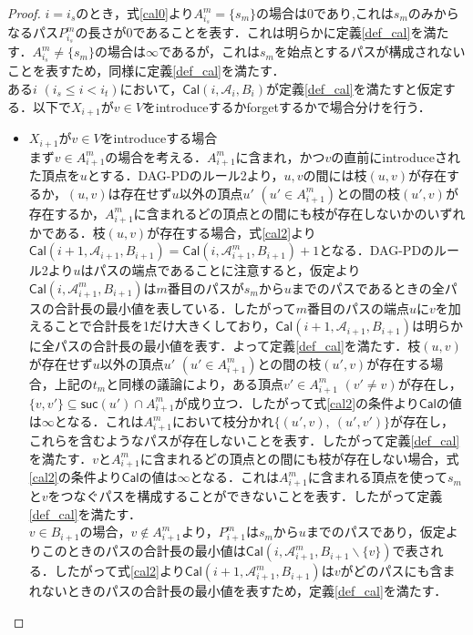 \documentclass[master]{kuisthesis}		%
\theoremstyle{plain}
\theoremstyle{definition}
\begin{document}
\begin{proof}
    $i=i_s$のとき，式\ref{cal0}より$A^m_{i_s} = \{s_m\}$の場合は0であり,これは$s_m$のみからなるパス$P^m_{i_s}$の長さが0であることを表す．これは明らかに定義\ref{def_cal}を満たす．$A^m_{i_s} \neq \{s_m\}$の場合は$\infty$であるが，これは$s_m$を始点とするパスが構成されないことを表すため，同様に定義\ref{def_cal}を満たす．\\
    ある$i$ $(i_s \leq i < i_t)$において，$\mathsf{Cal}(i, \mathscr{A}_i, B_i)$が定義\ref{def_cal}を満たすと仮定する．以下で$X_{i+1}$が$v \in V$をintroduceするかforgetするかで場合分けを行う．
    \begin{itemize}
        \item $X_{i+1}$が$v \in V$をintroduceする場合 \\
        まず$v \in A^m_{i+1}$の場合を考える．$A^m_{i+1}$に含まれ，かつ$v$の直前にintroduceされた頂点を$u$とする．DAG-PDのルール2より，$u, v$の間には枝$(u, v)$が存在するか，$(u, v)$は存在せず$u$以外の頂点$u'$ $(u' \in A^m_{i+1})$との間の枝$(u', v)$が存在するか，$A^m_{i+1}$に含まれるどの頂点との間にも枝が存在しないかのいずれかである．枝$(u, v)$が存在する場合，式\ref{cal2}より$\mathsf{Cal}(i+1, \mathscr{A}_{i+1}, B_{i+1}) = \mathsf{Cal}(i, \mathscr{A}^m_{i+1}, B_{i+1})+1$となる．DAG-PDのルール2より$u$はパスの端点であることに注意すると，仮定より$\mathsf{Cal}(i, \mathscr{A}^m_{i+1}, B_{i+1})$は$m$番目のパスが$s_m$から$u$までのパスであるときの全パスの合計長の最小値を表している．したがって$m$番目のパスの端点$u$に$v$を加えることで合計長を1だけ大きくしており，$\mathsf{Cal}(i+1, \mathscr{A}_{i+1}, B_{i+1})$は明らかに全パスの合計長の最小値を表す．よって定義\ref{def_cal}を満たす．枝$(u, v)$が存在せず$u$以外の頂点$u'$ $(u' \in A^m_{i+1})$との間の枝$(u', v)$が存在する場合，上記の$t_m$と同様の議論により，ある頂点$v' \in A^m_{i+1}$ $(v' \neq v)$が存在し，$\{v, v'\} \subseteq \mathsf{suc}(u') \cap A^m_{i+1}$が成り立つ．したがって式\ref{cal2}の条件より$\mathsf{Cal}$の値は$\infty$となる．これは$A^m_{i+1}$において枝分かれ$\{(u', v),\ (u', v')\}$が存在し，これらを含むようなパスが存在しないことを表す．したがって定義\ref{def_cal}を満たす．$v$と$A^m_{i+1}$に含まれるどの頂点との間にも枝が存在しない場合，式\ref{cal2}の条件より$\mathsf{Cal}$の値は$\infty$となる．これは$A^m_{i+1}$に含まれる頂点を使って$s_m$と$v$をつなぐパスを構成することができないことを表す．したがって定義\ref{def_cal}を満たす．\\
        $v \in B_{i+1}$の場合，$v \notin A^m_{i+1}$より，$P^m_{i+1}$は$s_m$から$u$までのパスであり，仮定よりこのときのパスの合計長の最小値は$\mathsf{Cal}(i, \mathscr{A}^m_{i+1}, B_{i+1} \backslash \{v\})$で表される．したがって式\ref{cal2}より$\mathsf{Cal}(i+1, \mathscr{A}^m_{i+1}, B_{i+1})$は$v$がどのパスにも含まれないときのパスの合計長の最小値を表すため，定義\ref{def_cal}を満たす．\\

\end{itemize}
\end{proof}
\end{document}
